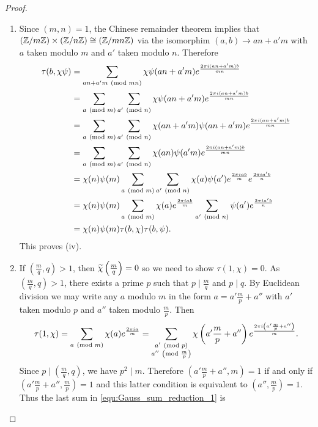 \begin{proof}
\begin{enumerate}[label=(\roman*)]
            \item Since $(m,n) = 1$, the Chinese remainder theorem implies that $(\mathbb{Z}/m\mathbb{Z}) \times (\mathbb{Z}/n\mathbb{Z}) \cong (\mathbb{Z}/mn\mathbb{Z})$ via the isomorphim $(a,b) \to an+a'm$ with $a$ taken modulo $m$ and $a'$ taken modulo $n$. Therefore
            \begin{align*}
              \tau(b,\chi\psi) &= \sum_{an+a'm \ \left(\text{mod }mn\right)}\chi\psi(an+a'm)e^{\frac{2\pi i(an+a'm)b}{mn}} \\
              &= \sum_{a\ \left(\text{mod }m\right)}\sum_{a'\ \left(\text{mod }n\right)}\chi\psi(an+a'm)e^{\frac{2\pi i(an+a'm)b}{mn}} \\
              &= \sum_{a\ \left(\text{mod }m\right)}\sum_{a'\ \left(\text{mod }n\right)}\chi(an+a'm)\psi(an+a'm)e^{\frac{2\pi i(an+a'm)b}{mn}} \\
              &= \sum_{a\ \left(\text{mod }m\right)}\sum_{a'\ \left(\text{mod }n\right)}\chi(an)\psi(a'm)e^{\frac{2\pi i(an+a'm)b}{mn}} \\
              &= \chi(n)\psi(m)\sum_{a\ \left(\text{mod }m\right)}\sum_{a'\ \left(\text{mod }n\right)}\chi(a)\psi(a')e^{\frac{2\pi iab}{m}}e^{\frac{2\pi ia'b}{n}} \\
              &= \chi(n)\psi(m)\sum_{a\ \left(\text{mod }m\right)}\chi(a)e^{\frac{2\pi iab}{m}}\sum_{a'\ \left(\text{mod }n\right)}\psi(a')e^{\frac{2\pi ia'b}{n}} \\
              &= \chi(n)\psi(m)\tau(b,\chi)\tau(b,\psi).
            \end{align*}
            This proves (iv).
            \item If $\left(\frac{m}{q},q\right) > 1$, then $\widetilde{\chi}\left(\frac{m}{q}\right) = 0$ so we need to show $\tau(1,\chi) = 0$. As $\left(\frac{m}{q},q\right) > 1$, there exists a prime $p$ such that $p \mid \frac{m}{q}$ and $p \mid q$. By Euclidean division we may write any $a$ modulo $m$ in the form $a = a'\frac{m}{p}+a''$ with $a'$ taken modulo $p$ and $a''$ taken modulo $\frac{m}{p}$. Then
            \begin{equation}\label{equ:Gauss_sum_reduction_1}
              \tau(1,\chi) = \sum_{a \ \left(\text{mod }m\right)}\chi(a)e^{\frac{2\pi ia}{m}} = \sum_{\substack{a' \ \left(\text{mod }p\right) \\ a'' \ \left(\text{mod }\frac{m}{p}\right)}}\chi\left(a'\frac{m}{p}+a''\right)e^{\frac{2\pi i\left(a'\frac{m}{p}+a''\right)}{m}}.
            \end{equation}
            Since $p \mid \left(\frac{m}{q},q\right)$, we have $p^{2} \mid m$. Therefore $\left(a'\frac{m}{p}+a'',m\right) = 1$ if and only if $\left(a'\frac{m}{p}+a'',\frac{m}{p}\right) = 1$ and this latter condition is equivalent to $\left(a'',\frac{m}{p}\right) = 1$. Thus the last sum in \cref{equ:Gauss_sum_reduction_1} is
            \[
\]
\end{enumerate}
\end{proof}
